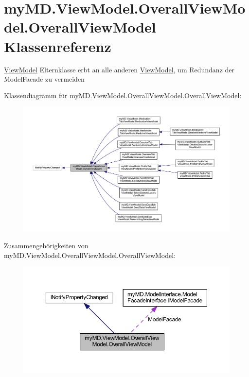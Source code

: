 \hypertarget{classmy_m_d_1_1_view_model_1_1_overall_view_model_1_1_overall_view_model}{}\section{my\+M\+D.\+View\+Model.\+Overall\+View\+Model.\+Overall\+View\+Model Klassenreferenz}
\label{classmy_m_d_1_1_view_model_1_1_overall_view_model_1_1_overall_view_model}


\mbox{\hyperlink{namespacemy_m_d_1_1_view_model}{View\+Model}} Elternklasse erbt an alle anderen \mbox{\hyperlink{namespacemy_m_d_1_1_view_model}{View\+Model}}, um Redundanz der Model\+Facade zu vermeiden  




Klassendiagramm für my\+M\+D.\+View\+Model.\+Overall\+View\+Model.\+Overall\+View\+Model\+:\nopagebreak
\begin{figure}[H]
\begin{center}
\leavevmode
\includegraphics[width=350pt]{classmy_m_d_1_1_view_model_1_1_overall_view_model_1_1_overall_view_model__inherit__graph}
\end{center}
\end{figure}


Zusammengehörigkeiten von my\+M\+D.\+View\+Model.\+Overall\+View\+Model.\+Overall\+View\+Model\+:\nopagebreak
\begin{figure}[H]
\begin{center}
\leavevmode
\includegraphics[width=350pt]{classmy_m_d_1_1_view_model_1_1_overall_view_model_1_1_overall_view_model__coll__graph}
\end{center}
\end{figure}
